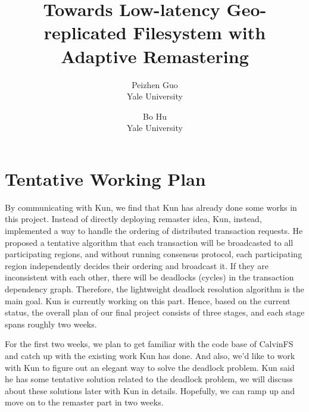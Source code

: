 \documentclass[letterpaper,twocolumn,10pt]{article}
\begin{document}
\date{}

\title{\Large \bf Towards Low-latency Geo-replicated Filesystem with Adaptive Remastering }

\author{
{\rm Peizhen Guo}\\
Yale University
\and
{\rm Bo Hu}\\
Yale University
}

\maketitle

\thispagestyle{empty}















\section{Tentative Working Plan}

By communicating with Kun, we find that Kun has already done some works in this project. Instead of directly deploying remaster idea, Kun, instead, implemented a way to handle the ordering of distributed transaction requests. He proposed a tentative algorithm that each transaction will be broadcasted to all participating regions, and without running consensus protocol, each participating region independently decides their ordering and broadcast it. If they are inconsistent with each other, there will be deadlocks (cycles) in the transaction dependency graph. Therefore, the lightweight deadlock resolution algorithm is the main goal. Kun is currently working on this part. Hence, based on the current status, the overall plan of our final project consists of three stages, and each stage spans roughly two weeks.


For the first two weeks, we plan to get familiar with the code base of CalvinFS and catch up with the existing work Kun has done. And also, we’d like to work with Kun to figure out an elegant way to solve the deadlock problem. Kun said he has some tentative solution related to the deadlock problem, we will discuss about these solutions later with Kun in details. Hopefully, we can ramp up and move on to the remaster part in two weeks.
\end{document}

